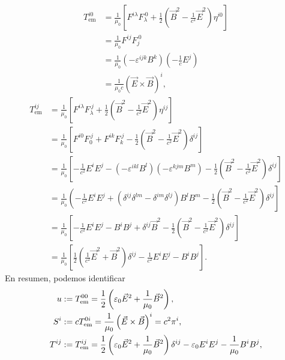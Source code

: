 \begin{align}
T_\text{em}^{i0}  & =\frac{1}{\mu_0}\left[ F^{i\lambda}F_\lambda^{\ 0}+\frac
{1}{2}\left(  \vec{B}^2-\frac{1}{c^2}\vec{E}^2\right)  \eta^{i0}\right] \\
& =\frac{1}{\mu_0}F^{ij}F_j^{\ 0}\\
& =\frac{1}{\mu_0}(-\varepsilon^{ijk}B^k)  (-\frac{1}{c}E^j) \\
& =\frac{1}{\mu_0c}\left(\vec{E}\times\vec{B}\right)^i,
\end{align}%
\begin{align}
T_\text{em}^{ij}  & =\frac{1}{\mu_0}\left[  F^{i\lambda}F_\lambda^{\ j}+\frac
{1}{2}\left( \vec{B}^2-\frac{1}{c^2}\vec{E}^2\right) \eta^{ij}\right] \\
& =\frac{1}{\mu_0}\left[F^{i0}F_0^{\ j}+F^{ik}F_k^{\ j}-\frac{1}{2}\left(
\vec{B}^2-\frac{1}{c^2}\vec{E}^2\right) \delta^{ij}\right] \\
& =\frac{1}{\mu_0}\left[-\frac{1}{c^2}E^i E^j -\left(-\varepsilon^{ikl}B^l\right)  \left(
-\varepsilon^{kjm}B^m \right) -\frac{1}{2}\left(
\vec{B}^2-\frac{1}{c^2}\vec{E}^2\right)\delta^{ij}\right] \\
& =\frac{1}{\mu_0}\left(-\frac{1}{c^2}E^i E^j
+\left(\delta^{ij}\delta^{lm}-\delta^{im}\delta^{lj}\right)B^l B^m
-\frac{1}{2}\left(\vec{B}^2-\frac{1}{c^2}\vec{E}^2\right)\delta^{ij}\right] \\
& =\frac{1}{\mu_0}\left[-\frac{1}{c^2}E^i E^j - B^i B^j +\delta^{ij}\vec{B}^2-\frac{1}{2}\left(\vec{B}^2-\frac{1}{c^2}\vec{E}^2\right)\delta^{ij}\right] \\
& =\frac{1}{\mu_0}\left[\frac{1}{2}\left(\frac{1}{c^2}\vec{E}^2 +\vec{B}^2\right)\delta^{ij}-\frac{1}{c^2}E^i E^j -B^i B^j\right].
\end{align}
En resumen, podemos identificar
\begin{align}
u &:= T_{\rm em}^{00}=\frac{1}{2}\left(\varepsilon_0\vec{E}^2+\frac{1}{\mu_0}\vec{B}^2\right),\label{uTheta}\\
S^i &:= cT_{\rm em}^{0i}=\frac{1}{\mu_0}\left(\vec{E}\times\vec{B}\right)^i=c^2\pi^i, \label{STheta}\\
T^{ij} &:= T_{\rm em}^{ij}= \frac{1}{2}\left(\varepsilon_0\vec{E}^2+\frac{1}{\mu_0}\vec{B}^2\right)\delta^{ij}-\varepsilon_0 E^i E^j -\frac{1}{\mu_0}B^i B^j , \label{TTheta}
\end{align}
